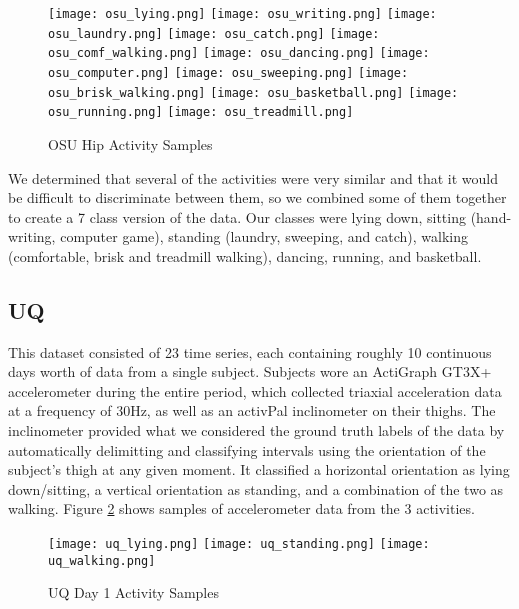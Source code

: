 \begin{figure}
 \centering
 \texttt{[image: osu\_lying.png]}
 \texttt{[image: osu\_writing.png]}
 \texttt{[image: osu\_laundry.png]}
 \texttt{[image: osu\_catch.png]}
 \texttt{[image: osu\_comf\_walking.png]}
 \texttt{[image: osu\_dancing.png]}
 \texttt{[image: osu\_computer.png]}
 \texttt{[image: osu\_sweeping.png]}
 \texttt{[image: osu\_brisk\_walking.png]}
 \texttt{[image: osu\_basketball.png]}
 \texttt{[image: osu\_running.png]}
 \texttt{[image: osu\_treadmill.png]}
 \caption{OSU Hip Activity Samples}
 \label{fig:osu_activities}
\end{figure}

We determined that several of the activities were very similar and that
it would be difficult to discriminate between them, so we combined some of them together to
create a 7 class version of the data.
Our classes were lying down, sitting (hand-writing, computer game),
standing (laundry, sweeping, and catch), walking (comfortable, brisk and treadmill walking),
dancing, running, and basketball.

\subsection{UQ}

This dataset consisted of 23 time series, each containing roughly 10 continuous
days worth of data from a single subject. Subjects wore an ActiGraph GT3X+
accelerometer during the entire period, which collected triaxial acceleration data at a frequency
of 30Hz, as well as an activPal inclinometer on their thighs. The inclinometer
provided what we considered the ground truth labels of the data by automatically
delimitting and classifying intervals using the orientation of the subject's thigh at any given moment. It 
classified a horizontal orientation as lying down/sitting,
a vertical orientation as standing, and a combination of the two as walking. Figure
\ref{fig:uq_activities} shows samples of accelerometer data from the 3 activities.

\begin{figure}
 \centering
 \texttt{[image: uq\_lying.png]}
 \texttt{[image: uq\_standing.png]}
 \texttt{[image: uq\_walking.png]}
 \caption{UQ Day 1 Activity Samples}
 \label{fig:uq_activities}
\end{figure}

